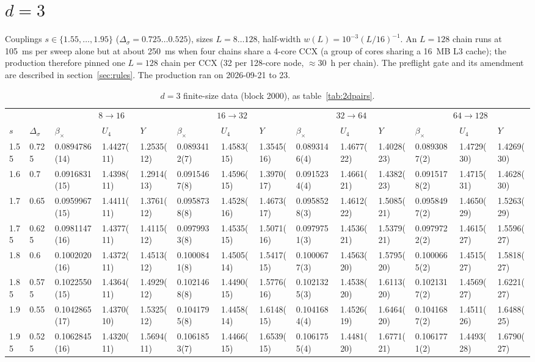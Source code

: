 \documentclass[10pt,a4paper]{article}
\newcommand{\Ds}{\Delta_\sigma}
\begin{document}
\section{\texorpdfstring{$d=3$}{d=3}}\label{sec:3d}
Couplings $s\in\{1.55,\dots,1.95\}$ ($\Ds=0.725\dots0.525$), sizes $L=8\dots128$, half-width $w(L)=10^{-3}(L/16)^{-1}$. An $L=128$ chain runs at
105~ms per sweep alone but at about 250~ms when four chains share a 4-core CCX (a group of cores sharing a 16~MB L3 cache); the production
therefore pinned one $L=128$ chain per CCX (32 per 128-core node, $\approx30$~h per chain). The preflight gate and its amendment are described in
section~\ref{sec:rules}. The production ran on 2026-09-21 to 23.
\begin{table}\centering\scriptsize
\caption{$d=3$ finite-size data (block 2000), as table~\ref{tab:2dpairs}.}\label{tab:3dpairs}
\begin{tabular}{@{}ll|lll|lll|lll|lll@{}}\toprule
 & & \multicolumn{3}{c|}{$8\to16$} & \multicolumn{3}{c|}{$16\to32$} & \multicolumn{3}{c|}{$32\to64$} & \multicolumn{3}{c}{$64\to128$}\\
$s$ & $\Ds$ & $\beta_\times$ & $U_4$ & $Y$ & $\beta_\times$ & $U_4$ & $Y$ & $\beta_\times$ & $U_4$ & $Y$ & $\beta_\times$ & $U_4$ & $Y$ \\\midrule
1.55 & 0.725 & 0.0894786(14) & 1.4427(11) & 1.2535(12) & 0.0893412(7) & 1.4583(15) & 1.3545(16) & 0.0893146(4) & 1.4677(22) & 1.4028(23) & 0.0893087(2) & 1.4729(30) & 1.4269(30) \\
1.6 & 0.7 & 0.0916831(15) & 1.4398(11) & 1.2914(13) & 0.0915467(8) & 1.4596(15) & 1.3970(17) & 0.0915234(4) & 1.4661(21) & 1.4382(23) & 0.0915178(2) & 1.4715(31) & 1.4628(30) \\
1.7 & 0.65 & 0.0959967(15) & 1.4411(11) & 1.3761(12) & 0.0958738(8) & 1.4528(16) & 1.4673(17) & 0.0958528(3) & 1.4612(22) & 1.5085(21) & 0.0958497(2) & 1.4650(29) & 1.5263(29) \\
1.75 & 0.625 & 0.0981147(16) & 1.4377(11) & 1.4115(12) & 0.0979933(8) & 1.4535(15) & 1.5071(16) & 0.0979751(3) & 1.4536(21) & 1.5379(21) & 0.0979722(2) & 1.4615(27) & 1.5596(27) \\
1.8 & 0.6 & 0.1002020(16) & 1.4372(11) & 1.4513(12) & 0.1000841(8) & 1.4505(14) & 1.5417(15) & 0.1000677(3) & 1.4563(20) & 1.5795(20) & 0.1000665(2) & 1.4515(27) & 1.5818(27) \\
1.85 & 0.575 & 0.1022550(15) & 1.4364(11) & 1.4929(12) & 0.1021468(8) & 1.4490(15) & 1.5776(16) & 0.1021325(3) & 1.4538(20) & 1.6113(20) & 0.1021317(2) & 1.4569(27) & 1.6221(27) \\
1.9 & 0.55 & 0.1042865(17) & 1.4370(10) & 1.5325(12) & 0.1041795(8) & 1.4458(14) & 1.6148(15) & 0.1041684(4) & 1.4526(19) & 1.6464(20) & 0.1041687(2) & 1.4511(26) & 1.6488(25) \\
1.95 & 0.525 & 0.1062845(16) & 1.4320(11) & 1.5694(11) & 0.1061853(7) & 1.4466(15) & 1.6539(15) & 0.1061755(4) & 1.4481(20) & 1.6771(21) & 0.1061771(2) & 1.4493(28) & 1.6790(27) \\
\bottomrule\end{tabular}
\end{table}
\end{document}

